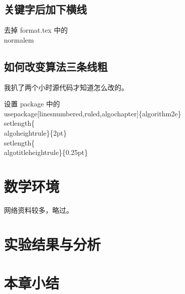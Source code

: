 \subsection{关键字后加下横线}

去掉 format.tex 中的 \\normalem

\subsection{如何改变算法三条线粗}

我扒了两个小时源代码才知道怎么改的。

设置 package 中的
\\usepackage[linesnumbered,ruled,algochapter]\{algorithm2e\}
\\setlength\{\\algoheightrule\}\{2pt\}
\\setlength\{\\algotitleheightrule\}\{0.25pt\}

\section{数学环境}

网络资料较多，略过。

\section{实验结果与分析}

\section{本章小结}
